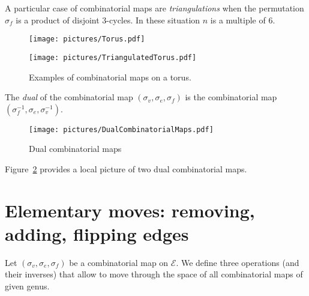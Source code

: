 \documentclass{article}
\def\cE{\mathcal{E}}
\begin{document}
A particular case of combinatorial maps are \emph{triangulations}
when the permutation $\sigma_f$ is a product of disjoint 3-cycles.
In these situation $n$ is a multiple of $6$.

\begin{figure}[!ht]
\begin{minipage}{0.4\textwidth}
\begin{center}
\texttt{[image: pictures/Torus.pdf]}
\end{center}
\end{minipage}
\hspace{0.1\textwidth}
\begin{minipage}{0.4\textwidth}
\begin{center}
\texttt{[image: pictures/TriangulatedTorus.pdf]}
\end{center}
\end{minipage}
\caption{Examples of combinatorial maps on a torus.}
\label{fig:CombinatorialMapTori}
\end{figure}


The \emph{dual} of the combinatorial map $(\sigma_v, \sigma_e, \sigma_f)$ is the combinatorial
map $(\sigma_f^{-1}, \sigma_e, \sigma_v^{-1})$.
\begin{figure}[!ht]
\begin{center}
\texttt{[image: pictures/DualCombinatorialMaps.pdf]}
\end{center}
\caption{Dual combinatorial maps}
\label{fig:DualCombinatorialMaps}
\end{figure}

Figure~\ref{fig:DualCombinatorialMaps} provides a local picture of two dual
combinatorial maps.

\section{Elementary moves: removing, adding, flipping edges}
\label{sec:ElementaryMoves}
Let $(\sigma_v, \sigma_e, \sigma_f)$ be a combinatorial map on $\cE$. We define three operations
(and their inverses) that allow to move through the space of all combinatorial maps of given genus.
\end{document}

